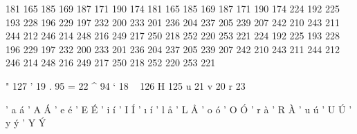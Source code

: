 

\startmapping[il2]

 181 165    185 169 
 187 171    190 174 
 181 165    185 169 
 187 171    190 174 
 224 192    225 193 
 228 196    229 197 
 232 200    233 201 
 236 204    237 205 
 239 207    242 210 
 243 211    244 212 
 246 214    248 216 
 249 217    250 218 
 252 220    253 221 
 224 192    225 193 
 228 196    229 197 
 232 200    233 201 
 236 204    237 205 
 239 207    242 210 
 243 211    244 212 
 246 214    248 216 
 249 217    250 218 
 252 220    253 221 

\stopmapping

\startcoding[il2]


 " 127
 '  19
 .  95
 =  22
 ^  94
 `  18
 ~ 126
 H 125
 u  21
 v  20
 r  23 

 ' a    ^^e1    ' A    ^^c1
 ' e    ^^e9    ' E    ^^c9
 ' i    ^^ed    ' I    ^^cd
 ' {\i} ^^ed
 ' l    ^^e5    ' L    ^^c5
 ' o    ^^f3    ' O    ^^d3
 ' r    ^^e0    ' R    ^^c0
 ' u    ^^fa    ' U    ^^da
 ' y    ^^fd    ' Y    ^^dd

